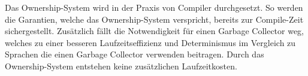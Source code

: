 Das Ownership-System wird in der Praxis von Compiler durchgesetzt. So werden die Garantien, welche das Ownership-System
verspricht, bereits zur Compile-Zeit sichergestellt. Zusätzlich fällt die Notwendigkeit für einen Garbage Collector weg, welches
zu einer besseren Laufzeitseffizienz und Determinismus im Vergleich zu Sprachen die einen Garbage Collector verwenden beitragen.
Durch das Ownership-System entstehen keine zusätzlichen Laufzeitkosten\cite{whatIsOwnership}.









